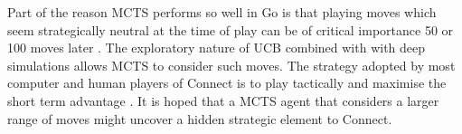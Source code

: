 Part of the reason {MCTS} performs so well in {Go} is that playing moves which seem strategically neutral at the time of play can be of critical importance 50 or 100 moves later \cite{go}. The exploratory nature of {UCB} combined with with deep simulations allows {MCTS} to consider such moves. The strategy adopted by most computer and human players of {Connect} is to play tactically and maximise the short term advantage \cite{connectk,connect6}. It is hoped that a {MCTS} agent that considers a larger range of moves might uncover a hidden strategic element to {Connect}.











